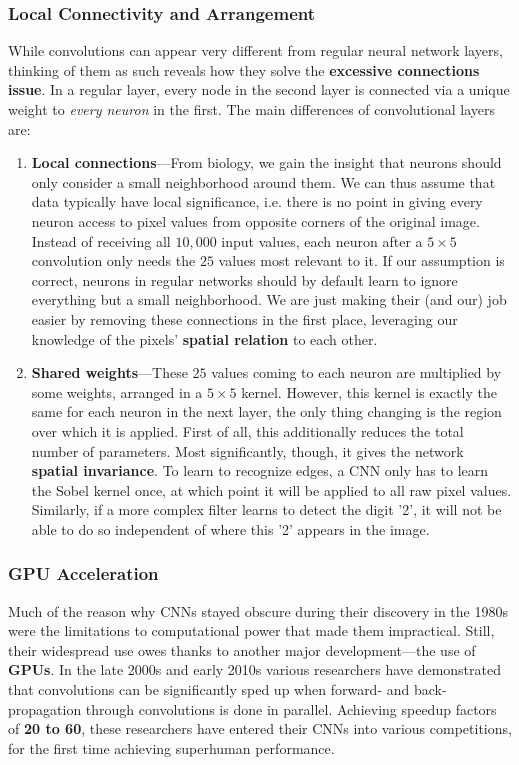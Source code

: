 \documentclass{article}
\begin{document}
\subsubsection{Local Connectivity and Arrangement}
While convolutions can appear very different from regular neural network layers, thinking of them as such reveals how they solve the \textbf{excessive connections issue}. In a regular layer, every node in the second layer is connected via a unique weight to \textit{every neuron} in the first. The main differences of convolutional layers are:
\begin{enumerate}
    \item \textbf{Local connections}—From biology, we gain the insight that neurons should only consider a small neighborhood around them. We can thus assume that data typically have local significance, i.e. there is no point in giving every neuron access to pixel values from opposite corners of the original image. Instead of receiving all $10,000$ input values, each neuron after a $5\times5$ convolution only needs the $25$ values most relevant to it. If our assumption is correct, neurons in regular networks should by default learn to ignore everything but a small neighborhood. We are just making their (and our) job easier by removing these connections in the first place, leveraging our knowledge of the pixels' \textbf{spatial relation} to each other.
    \item \textbf{Shared weights}—These $25$ values coming to each neuron are multiplied by some weights, arranged in a $5\times5$ kernel. However, this kernel is exactly the same for each neuron in the next layer, the only thing changing is the region over which it is applied. First of all, this additionally reduces the total number of parameters. Most significantly, though, it gives the network \textbf{spatial invariance}. To learn to recognize edges, a CNN only has to learn the Sobel kernel once, at which point it will be applied to all raw pixel values. Similarly, if a more complex filter learns to detect the digit '2', it will not be able to do so independent of where this '2' appears in the image.
\end{enumerate}
\subsubsection{GPU Acceleration}
Much of the reason why CNNs stayed obscure during their discovery in the 1980s were the limitations to computational power that made them impractical. Still, their widespread use owes thanks to another major development—the use of \textbf{GPUs}. In the late 2000s and early 2010s various researchers have demonstrated that convolutions can be significantly sped up when forward- and back-propagation through convolutions is done in parallel. Achieving speedup factors of \textbf{20 to 60}, these researchers have entered their CNNs into various competitions, for the first time achieving superhuman performance.
\end{document}
